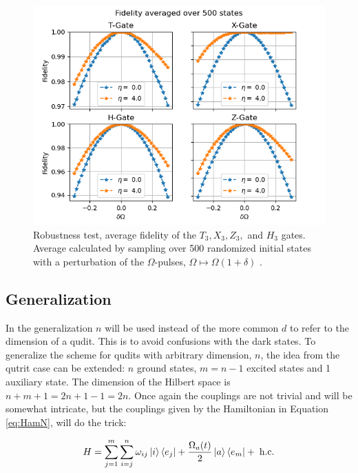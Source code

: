 \begin{figure}[H]
\includegraphics[scale=1]{figures/Fid500.png}

\caption{Robustness test, average fidelity of the $T_3,X_3,Z_3,$ and $H_3$ gates. Average calculated by sampling over 500 randomized initial states with a perturbation of the $\Omega$-pulses, $\Omega \mapsto \Omega(1+\delta)$ .}
\label{fig:fidelity}
\end{figure}

\newpage
\subsection{Generalization}
In the generalization $n$ will be used instead of the more common $d$ to refer to the dimension of a qudit. This is to avoid confusions with the dark states. To generalize the scheme for qudits with arbitrary dimension, $n$, the idea from the qutrit case can be extended: $n$ ground states, $m = n - 1$ excited states and 1 auxiliary state. The dimension of the Hilbert space is  $n + m + 1 = 2n + 1 -1 = 2n$. Once again the couplings are not trivial and will be somewhat intricate, but the couplings given by the Hamiltonian in Equation \ref{eq:HamN}, will do the trick:

\begin{equation}
H = \sum_{j = 1}^m \sum_{i = j}^n \omega_{ij} \ket{i}\bra{e_j} + \frac{\Omega_a(t)}{2}\ket{a}\bra{e_m} +\;\text{h.c}.
\label{eq:HamN}
\end{equation}

